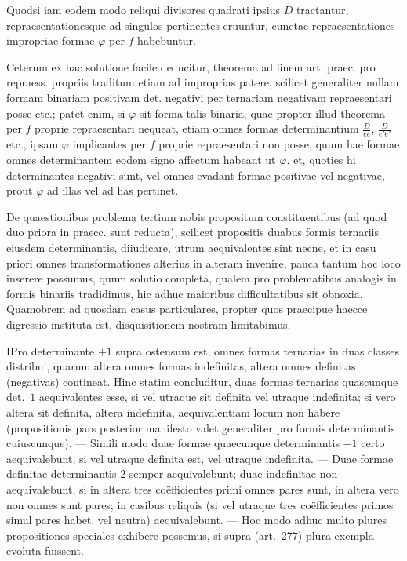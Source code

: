 Quodsi iam eodem modo reliqui divisores quadrati ipsius $D$ tractantur, repraesentationesque ad singulos pertinentes eruuntur, cunctae repraesentationes impropriae formae $\varphi$ per $f$ habebuntur.

Ceterum ex hac solutione facile deducitur, theorema ad finem art. praec. pro repraess. propriis traditum etiam ad improprias patere, scilicet generaliter nullam formam binariam positivam det. negativi per ternariam negativam repraesentari posse etc.; patet enim, si $\varphi$ sit forma talis binaria, quae propter illud theorema per $f$ proprie repraesentari nequeat, etiam omnes formas determinantium $\frac{D}{ee}$, $\frac{D}{e'e'}$ etc., ipsam $\varphi$ implicantes per $f$ proprie repraesentari non posse, quum hae formae omnes determinantem eodem signo affectum habeant ut $\varphi$. et, quoties hi determinantes negativi sunt, vel omnes evadant formae positivae vel negativae, prout $\varphi$ ad illas vel ad has pertinet.

De quaestionibus problema tertium nobis propositum constituentibus (ad quod duo priora in praecc. sunt reducta), scilicet propositis duabus formis ternariis eiusdem determinantis, diiudicare, utrum aequivalentes sint necne, et in casu priori omnes transformationes alterius in alteram invenire, pauca tantum hoc loco inserere possumus, quum solutio completa, qualem pro problematibus analogis in formis binariis tradidimus, hic adhuc maioribus difficultatibus sit obnoxia.
Quamobrem ad quosdam casus particulares, propter quos praecipue haecce digressio instituta est, disquisitionem nostram limitabimus.

I\quad Pro determinante $+1$ supra ostensum est, omnes formas ternarias in duas classes distribui, quarum altera omnes formas indefinitas, altera omnes definitas (negativas) contineat. Hinc statim concluditur, duas formas ternarias quascunque det.~$1$ aequivalentes esse, si vel utraque sit definita vel utraque indefinita; si vero altera sit definita, altera indefinita, aequivalentiam locum non habere (propositionis pars posterior manifesto valet generaliter pro formis determinantis cuiuscunque). --- Simili modo duae formae quaecunque determinantis $-1$ certo aequivalebunt, si vel utraque definita est, vel utraque indefinita. --- Duae formae definitae determinantis $2$ semper aequivalebunt; duae indefinitae non aequivalebunt, si in altera tres coëfficientes primi omnes pares sunt, in altera vero non omnes sunt pares; in casibus reliquis (si vel utraque tres coëfficientes primos simul pares habet, vel neutra) aequivalebunt. --- Hoc modo adhuc multo plures propositiones speciales exhibere possemus, si supra (art.~277) plura exempla evoluta fuissent.

